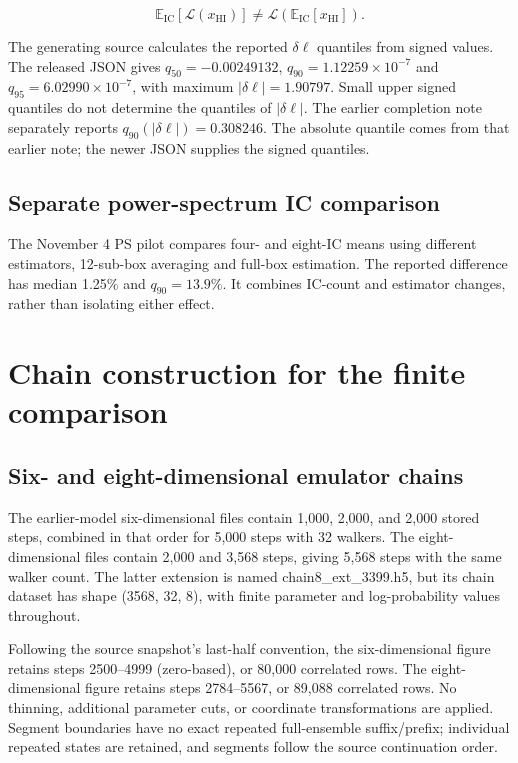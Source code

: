 \[
\mathbb{E}_{\mathrm{IC}}[\mathcal{L}(x_{\mathrm{HI}})]
\ne \mathcal{L}(\mathbb{E}_{\mathrm{IC}}[x_{\mathrm{HI}}]).
\]

The generating source calculates the reported $\delta\ell$ quantiles from signed values. The released JSON gives $q_{50}=-0.00249132$, $q_{90}=1.12259\times10^{-7}$ and $q_{95}=6.02990\times10^{-7}$, with maximum $|\delta\ell|=1.90797$. Small upper signed quantiles do not determine the quantiles of $|\delta\ell|$. The earlier completion note separately reports $q_{90}(|\delta\ell|)=0.308246$. The absolute quantile comes from that earlier note; the newer JSON supplies the signed quantiles.



\subsection{Separate power-spectrum IC comparison}

The November 4 PS pilot compares four- and eight-IC means using different estimators, 12-sub-box averaging and full-box estimation. The reported difference has median 1.25\% and $q_{90}=13.9\%$. It combines IC-count and estimator changes, rather than isolating either effect.

\section{Chain construction for the finite comparison}\label{app:current-chains}

\subsection{Six- and eight-dimensional emulator chains}\label{new-six--and-eight-dimensional-emulator-chains}

The earlier-model six-dimensional files contain 1,000, 2,000, and 2,000 stored steps, combined in that order for 5,000 steps with 32 walkers. The eight-dimensional files contain 2,000 and 3,568 steps, giving 5,568 steps with the same walker count. The latter extension is named chain8\_ext\_3399.h5, but its chain dataset has shape (3568, 32, 8), with finite parameter and log-probability values throughout.

Following the source snapshot's last-half convention, the six-dimensional figure retains steps 2500--4999 (zero-based), or 80,000 correlated rows. The eight-dimensional figure retains steps 2784--5567, or 89,088 correlated rows. No thinning, additional parameter cuts, or coordinate transformations are applied. Segment boundaries have no exact repeated full-ensemble suffix/prefix; individual repeated states are retained, and segments follow the source continuation order.

